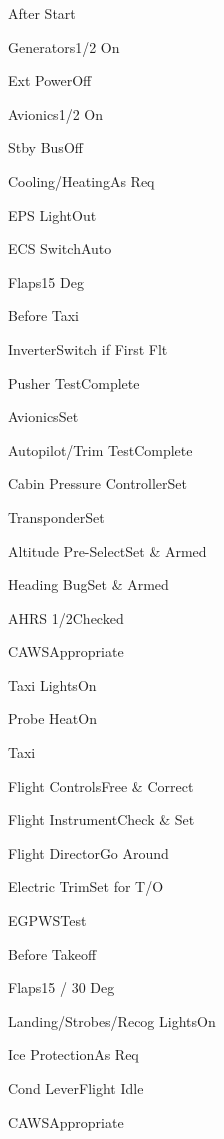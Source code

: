 \documentclass[sim-use, halfpage]{checklist}
\begin{document}
\begin{checklist}{After Start}
  \item{Generators}{1/2 On}
  \item{Ext Power}{Off}
  \item{Avionics}{1/2 On}
  \item{Stby Bus}{Off}
  \item{Cooling/Heating}{As Req}
  \item{EPS Light}{Out}
  \item{ECS Switch}{Auto}
  \item{Flaps}{15 Deg}
\end{checklist}

\begin{checklist}{Before Taxi}
  \item{Inverter}{Switch if First Flt}
  \item{Pusher Test}{Complete}
  \item{Avionics}{Set}
  \item{Autopilot/Trim Test}{Complete}
  \item{Cabin Pressure Controller}{Set}
  \item{Transponder}{Set}
  \item{Altitude Pre-Select}{Set \& Armed}
  \item{Heading Bug}{Set \& Armed}
  \item{AHRS 1/2}{Checked}
  \item{CAWS}{Appropriate}
  \item{Taxi Lights}{On}
  \item{Probe Heat}{On}
\end{checklist}

\begin{checklist}{Taxi}
  \item{Flight Controls}{Free \& Correct}
  \item{Flight Instrument}{Check \& Set}
  \item{Flight Director}{Go Around}
  \item{Electric Trim}{Set for T/O}
  \item{EGPWS}{Test}
\end{checklist}

\begin{checklist}{Before Takeoff}
  \item{Flaps}{15 / 30 Deg}
  \item{Landing/Strobes/Recog Lights}{On}
  \item{Ice Protection}{As Req}
  \item{Cond Lever}{Flight Idle}
  \item{CAWS}{Appropriate}
\end{checklist}
\end{document}
